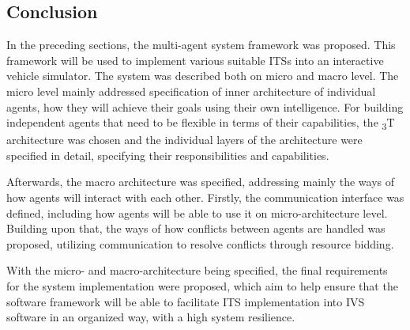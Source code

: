 \documentclass[main.tex]{subfiles}
\begin{document}



\subsection{Conclusion}

In the preceding sections, the multi-agent system framework was proposed. This framework will be used to implement various 
suitable ITSs into an interactive vehicle simulator. The system was described both on micro and macro level. The micro level 
mainly addressed specification of inner architecture of individual agents, how they will achieve their goals using their 
own intelligence. For building independent agents that need to be flexible in terms of their capabilities, the \textsubscript{3}T
architecture was chosen and the individual layers of the architecture were specified in detail, specifying their responsibilities
and capabilities. 

Afterwards, the macro architecture was specified, addressing mainly the ways of how agents will interact with each other. 
Firstly, the communication interface was defined, including how agents will be able to use it on micro-architecture level.
Building upon that, the ways of how conflicts between agents are handled was proposed, utilizing communication to resolve 
conflicts through resource bidding. 

With the micro- and macro-architecture being specified, the final requirements for the system implementation were proposed, 
which aim to help ensure that the software framework will be able to facilitate ITS implementation into IVS software in an 
organized way, with a high system resilience.

\clearpage
\end{document}
